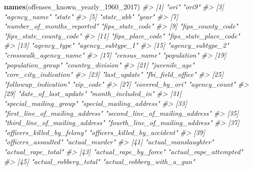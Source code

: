 \documentclass[
  12pt,
]{book}
\newenvironment{Shaded}{\begin{snugshade}}{\end{snugshade}}
\newcommand{\CommentTok}[1]{\textcolor[rgb]{0.37,0.37,0.37}{\textit{#1}}}
\newcommand{\DecValTok}[1]{\textcolor[rgb]{0.06,0.06,0.06}{#1}}
\newcommand{\KeywordTok}[1]{\textcolor[rgb]{0.27,0.27,0.27}{\textbf{#1}}}
\newcommand{\NormalTok}[1]{#1}
\begin{document}
\begin{Shaded}
\begin{Highlighting}[]
\KeywordTok{names}\NormalTok{(offenses\_known\_yearly\_}\DecValTok{1960}\NormalTok{\_}\DecValTok{2017}\NormalTok{)}
\CommentTok{\#\textgreater{}   [1] "ori"                            "ori9"                          }
\CommentTok{\#\textgreater{}   [3] "agency\_name"                    "state"                         }
\CommentTok{\#\textgreater{}   [5] "state\_abb"                      "year"                          }
\CommentTok{\#\textgreater{}   [7] "number\_of\_months\_reported"      "fips\_state\_code"               }
\CommentTok{\#\textgreater{}   [9] "fips\_county\_code"               "fips\_state\_county\_code"        }
\CommentTok{\#\textgreater{}  [11] "fips\_place\_code"                "fips\_state\_place\_code"         }
\CommentTok{\#\textgreater{}  [13] "agency\_type"                    "agency\_subtype\_1"              }
\CommentTok{\#\textgreater{}  [15] "agency\_subtype\_2"               "crosswalk\_agency\_name"         }
\CommentTok{\#\textgreater{}  [17] "census\_name"                    "population"                    }
\CommentTok{\#\textgreater{}  [19] "population\_group"               "country\_division"              }
\CommentTok{\#\textgreater{}  [21] "juvenile\_age"                   "core\_city\_indication"          }
\CommentTok{\#\textgreater{}  [23] "last\_update"                    "fbi\_field\_office"              }
\CommentTok{\#\textgreater{}  [25] "followup\_indication"            "zip\_code"                      }
\CommentTok{\#\textgreater{}  [27] "covered\_by\_ori"                 "agency\_count"                  }
\CommentTok{\#\textgreater{}  [29] "date\_of\_last\_update"            "month\_included\_in"             }
\CommentTok{\#\textgreater{}  [31] "special\_mailing\_group"          "special\_mailing\_address"       }
\CommentTok{\#\textgreater{}  [33] "first\_line\_of\_mailing\_address"  "second\_line\_of\_mailing\_address"}
\CommentTok{\#\textgreater{}  [35] "third\_line\_of\_mailing\_address"  "fourth\_line\_of\_mailing\_address"}
\CommentTok{\#\textgreater{}  [37] "officers\_killed\_by\_felony"      "officers\_killed\_by\_accident"   }
\CommentTok{\#\textgreater{}  [39] "officers\_assaulted"             "actual\_murder"                 }
\CommentTok{\#\textgreater{}  [41] "actual\_manslaughter"            "actual\_rape\_total"             }
\CommentTok{\#\textgreater{}  [43] "actual\_rape\_by\_force"           "actual\_rape\_attempted"         }
\CommentTok{\#\textgreater{}  [45] "actual\_robbery\_total"           "actual\_robbery\_with\_a\_gun"     }

\end{Highlighting}
\end{Shaded}
\end{document}
